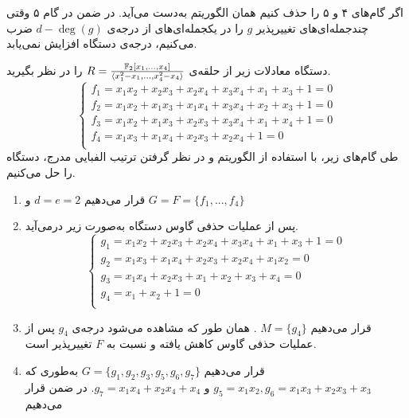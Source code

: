 اگر گام‌های ۴ و ۵ را حذف کنیم همان الگوریتم 
به‌دست  می‌آید. در ضمن در گام ۵ وقتی چندجمله‌ای‌های تغییرپذیر 
 $g$
را در یکجمله‌ای‌های از درجه‌ی 
$d - \deg(g)$
ضرب می‌کنیم، درجه‌ی دستگاه افزایش نمی‌یابد. 
\begin{example}
\label{example:XL_eq}
دستگاه معادلات زیر از حلقه‌ی 
$R = \frac{\mathbb{F}_{2}[x_{1},...,x_{4}]}{\langle x_{1}^{2} - x_{1},...,x_{4}^{2} - x_{4} \rangle}$
را در نظر بگیرید. 
\begin{equation*}
\left \{ \begin{array}{l}
f_{1} = x_{1}x_{2} + x_{2}x_{3} + x_{2}x_{4} + x_{3}x_{4} + x_{1} + x_{3} + 1 = 0\\
f_{2} = x_{1}x_{2} + x_{1}x_{3} + x_{1}x_{4} + x_{3}x_{4} + x_{2} + x_{3} + 1 = 0\\
f_{3} = x_{1}x_{2} + x_{1}x_{3} + x_{2}x_{3} + x_{3}x_{4} + x_{1} + x_{4} + 1 = 0\\
f_{4} = x_{1}x_{3} + x_{1}x_{4} + x_{2}x_{3} + x_{2}x_{4} + 1 =0\\
\end{array} \right.
\end{equation*}
طی گام‌های زیر، با استفاده از الگوریتم 
و در نظر گرفتن ترتیب الفبایی مدرج، دستگاه را حل می‌کنیم.
\begin{enumerate}
\item
قرار می‌دهیم 
$d = e = 2$
و
$G = F = \{f_{1},...,f_{4}\}$
\item
پس از عملیات حذفی گاوس دستگاه به‌صورت زیر درمی‌آید.
\begin{equation*}
\left \{ \begin{array}{l}
g_{1} = x_{1}x_{2} + x_{2}x_{3} + x_{2}x_{4} + x_{3}x_{4} + x_{1} + x_{3} + 1 = 0\\
g_{2} = x_{1}x_{3} + x_{1}x_{4} + x_{2}x_{3} + x_{2}x_{4} + x_{1}x_{2} = 0\\
g_{3} = x_{1}x_{4} + x_{2}x_{3} + x_{1} + x_{2} + x_{3} + x_{4} = 0\\
g_{4} = x_{1} + x_{2} + 1 = 0\\
\end{array} \right.
\end{equation*}
\item 
قرار می‌دهیم 
$M = \{g_{4}\}$
. همان طور که مشاهده می‌شود درجه‌ی 
$g_{4}$
پس از عملیات حذفی گاوس کاهش یافته و نسبت به 
$F$
تغییر‌پذیر است. 
\item
قرار می‌دهیم 
$G = \{g_{1},g_{2},g_{3},g_{5}, g_{6}, g_{7}\}$
به‌طوری که 
$g_{5} = x_{1}x_{2}, g_{6} = x_{1}x_{3} + x_{2}x_{3} + x_{3}$
و
$g_{7} = x_{1}x_{4} + x_{2}x_{4} + x_{4}$.
 در ضمن قرار می‌دهیم  

\end{enumerate}
\end{example}
